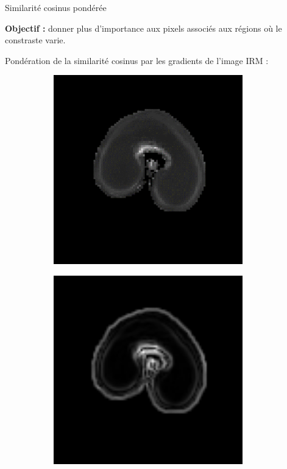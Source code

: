\documentclass[10pt]{beamer}
\begin{document}
\begin{frame}{Similarité cosinus pondérée}

  \textbf{Objectif :} donner plus d'importance aux pixels associés aux régions où le constraste varie.

  Pondération de la similarité cosinus par les gradients de l'image IRM :

  \begin{figure}[ht]
    \centering
    \begin{subfigure}[t]{0.33\textwidth}
      \centering
      \includegraphics[width=0.9\textwidth]{fig/mri_slice8_250}
      \caption{}
      \label{subfig:mri_slice8_250}
    \end{subfigure}%
    \begin{subfigure}[t]{0.33\textwidth}
      \centering
      \includegraphics[width=0.9\textwidth]{fig/mri_slice8_sobel}

\end{subfigure}
\end{figure}
\end{frame}
\end{document}
